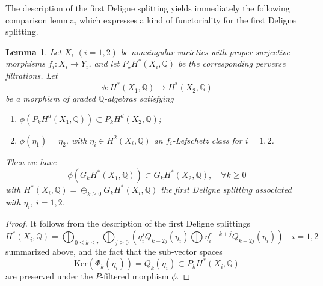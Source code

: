 \documentclass[11pt]{amsart}
\theoremstyle{plain}
\newtheorem{lem}[thm]{Lemma}
\theoremstyle{definition}
\theoremstyle{remark}
\newcommand{\BQ}{{\mathbb{Q}}}
\begin{document}
The description of the first Deligne splitting yields immediately the following comparison lemma, which expresses a kind of functoriality for the first Deligne splitting.

{
\begin{lem}\label{comparison1}
Let $X_i$ $(i=1,2)$ be nonsingular varieties with proper surjective morphisms $f_i: X_i \to Y_i$, and let $P_\star H^*(X_i, \BQ)$ be the corresponding perverse filtrations.  Let  
\[
\phi: H^*(X_1, \BQ) \to H^*(X_2, \BQ)
\]
be a morphism
of graded $\BQ$-algebras satisfying 
\begin{enumerate}
    \item[(a)] $\phi(P_kH^d(X_1, \BQ)) \subset P_kH^d(X_2, \BQ)$;
    \item[(b)] $\phi(\eta_1) = \eta_2$,  with {$\eta_i \in H^2(X_i, \BQ)$ an $f_i$-Lefschetz class for $i= 1,2$.}
\end{enumerate}
Then we have
\[
\phi(G_kH^*(X_1, \BQ)) \subset G_k H^*(X_2, \BQ), \quad \forall k \geq 0
\]
with $ H^*(X_i,\BQ)= \oplus_{k\geq 0}G_kH^*(X_i, \BQ)$ the first Deligne splitting associated with $\eta_i$, $i=1,2$.
\end{lem}

\begin{proof}
It follows from the description of the first Deligne splittings 
\[H^*(X_i, \BQ) = \bigoplus_{0 \leq k \leq r} 
 \bigoplus_{j \geq 0} 
 \left(\eta^j_i Q_{k-2j}(\eta_i)  \bigoplus \eta^{r-k+j}_i Q_{k-2j}  (\eta_i)
 \right) \quad i=1,2
\] 
summarized above, and the fact that the sub-vector spaces
\[
\mathrm{Ker}(\Phi_k (\eta_i)) = Q_k (\eta_i) \subset P_kH^*(X_i, \BQ)
\]
are preserved under the $P$-filtered morphism $\phi$.
\end{proof}
}
\end{document}

